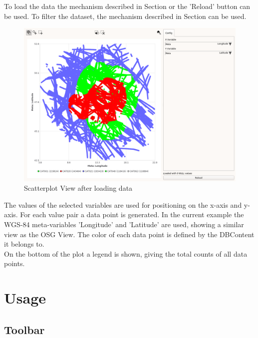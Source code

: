 To load the data the mechanism described in Section  or the 'Reload' button can be used. To filter the dataset, the mechanism described in Section  can be used. \\

\begin{figure}[H]
    \hspace*{-2cm}
    \includegraphics[width=18cm,frame]{figures/scatter_loaded.png}
  \caption{Scatterplot View after loading data}
\end{figure}

The values of the selected variables are used for positioning on the x-axis and y-axis. For each value pair a data point is generated. In the current example the WGS-84 meta-variables 'Longitude' and 'Latitude' are used, showing a similar view as the OSG View.
The color of each data point is defined by the DBContent it belongs to.\\


On the bottom of the plot a legend is shown, giving the total counts of all data points.

\section{Usage}

\subsection{Toolbar}

